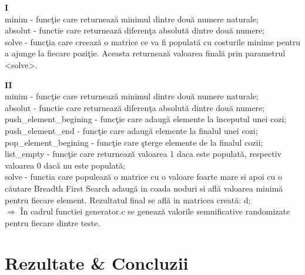 \documentclass{article}
\begin{document}
\par \textbf{I} 
\\ minim - func\c{t}ie care returneaz\u{a} minimul dintre dou\u{a} numere naturale;
\\absolut - functie care returneaz\u{a} diferen\c{t}a absolut\u{a} dintre dou\u{a} numere;
\\ solve - func\c{t}ia care creeaz\u{a} o matrice ce va fi populat\u{a} cu costurile minime pentru a ajunge la fiecare pozi\c{t}ie. Aceasta returneaz\u{a} valoarea final\u{a} prin parametrul <solve>.
\par \textbf{II}
\\ minim - func\c{t}ie care returneaz\u{a} minimul dintre dou\u{a} numere naturale;
\\absolut - functie care returneaz\u{a} diferen\c{t}a absolut\u{a} dintre dou\u{a} numere;
\\push\_element\_begining - func\c{t}ie care adaug\u{a} elemente la \^{i}nceputul unei cozi;
\\push\_element\_end - func\c{t}ie care adaug\u{a} elemente la finalul unei cozi;
\\pop\_element\_begining - func\c{t}ie care \c{s}terge elemente de la finalul cozii;
\\list\_empty - func\c{t}ie care returneaz\u{a} valoarea 1 daca este populat\u{a}, respectiv valoarea 0 dac\u{a} nu este populat\u{a};
\\solve - functia care populeaz\u{a} o matrice cu o valoare foarte mare si apoi cu o c\u{a}utare Breadth First Search adaug\u{a} in coada noduri si afl\u{a} valoarea minim\u{a} pentru fiecare element. Rezultatul final se afl\u{a} in matricea creat\u{a}: d\big[n-1]\big[n-1];
\\ $\Rightarrow$
 \^{I}n cadrul functiei generator.c se geneaz\u{a} valorile semnificative
randomizate pentru fiecare dintre teste.

\section{Rezultate \& Concluzii}
\end{document}
